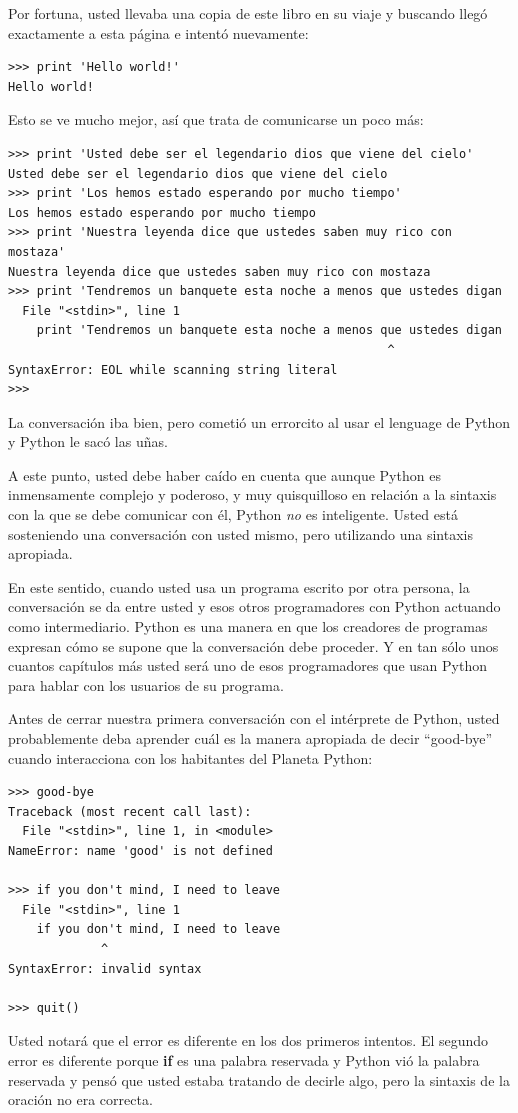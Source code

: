 Por fortuna, usted llevaba una copia de este libro en su viaje y buscando lleg\'o exactamente a esta p\'agina e intent\'o nuevamente:

\beforeverb
\begin{verbatim}
>>> print 'Hello world!'
Hello world!
\end{verbatim}
\afterverb
%
Esto se ve mucho mejor, as\'i que trata de comunicarse un poco m\'as:

\beforeverb
\begin{verbatim}
>>> print 'Usted debe ser el legendario dios que viene del cielo'
Usted debe ser el legendario dios que viene del cielo
>>> print 'Los hemos estado esperando por mucho tiempo'
Los hemos estado esperando por mucho tiempo
>>> print 'Nuestra leyenda dice que ustedes saben muy rico con mostaza'
Nuestra leyenda dice que ustedes saben muy rico con mostaza
>>> print 'Tendremos un banquete esta noche a menos que ustedes digan
  File "<stdin>", line 1
    print 'Tendremos un banquete esta noche a menos que ustedes digan
                                                     ^
SyntaxError: EOL while scanning string literal
>>> 
\end{verbatim}
\afterverb
%
La conversaci\'on iba bien, pero cometi\'o un errorcito al usar el lenguage de Python y Python 
le sac\'o las u\~nas.

A este punto, usted debe haber ca\'ido en cuenta que aunque Python 
es inmensamente complejo y poderoso, y muy quisquilloso en relaci\'on a la sintaxis con la que se debe comunicar con \'el, Python {\em 
no} es inteligente. Usted est\'a sosteniendo una conversaci\'on con usted mismo, pero utilizando una sintaxis apropiada.

En este sentido, cuando usted usa un programa escrito por otra persona, la conversaci\'on se da entre usted y esos otros programadores con Python actuando como intermediario.  Python
es una manera en que los creadores de programas expresan c\'omo se supone que la conversaci\'on debe proceder. Y en tan s\'olo unos cuantos cap\'itulos m\'as usted ser\'a uno de esos programadores que usan Python para hablar con los usuarios de su programa.

Antes de cerrar nuestra primera conversaci\'on con el int\'erprete de Python, usted probablemente deba aprender cu\'al es la manera apropiada de decir ``good-bye'' cuando interacciona con los habitantes del Planeta Python:

\beforeverb
\begin{verbatim}
>>> good-bye
Traceback (most recent call last):
  File "<stdin>", line 1, in <module>
NameError: name 'good' is not defined

>>> if you don't mind, I need to leave
  File "<stdin>", line 1
    if you don't mind, I need to leave
             ^
SyntaxError: invalid syntax

>>> quit()
\end{verbatim}
\afterverb
%
Usted notar\'a que el error es diferente en los dos primeros intentos. El segundo error es diferente porque 
{\bf if} es una palabra reservada y Python vi\'o la palabra reservada y pens\'o que usted estaba tratando de decirle algo, pero la sintaxis de la oraci\'on no era correcta.

